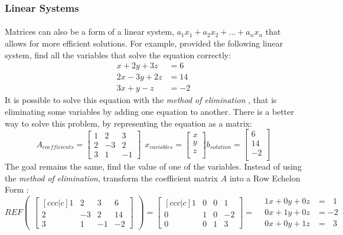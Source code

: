 \documentclass[11pt]{article}
\newcommand\simpleparagraph[1]{%
	\stepcounter{paragraph}\paragraph*{\theparagraph\quad{}#1}}
\renewcommand\theparagraph{}
\begin{document}
\subsubsection{Linear Systems}
\simpleparagraph{}
Matrices can also be a form of a linear system, $a_{1}x_{1}+a_{2}x_{2}+...+a_{n}x_{n}$ that allows for more efficient solutions. For example, provided the following linear system, find all the variables that solve the equation correctly:
{ \small
	\begin{align*}
	x+2y+3z &= 6\\
	2x-3y+2z &= 14\\
	3x+y-z   &= -2
	\end{align*}
}
It is possible to solve this equation with the \textit{method of elimination} \cite{_elimination_2011}, that is eliminating some variables by adding one equation to another. There is a better way to solve this problem, by representing the equation as a matrix:
{ \small
	\begin{equation}
	A_{coefficients} = \begin{bmatrix}
	1 & 2 & 3 \\
	2 & -3& 2 \\
	3 &  1& -1 
	\end{bmatrix}
	\hspace{5pt}
	x_{variables} = \begin{bmatrix}
	x \\
	y \\
	z \\
	\end{bmatrix}
	b_{solution} = \begin{bmatrix}
	6 \\
	14 \\
	-2 \\
	\end{bmatrix}
	\end{equation}
}
The goal remains the same, find the value of one of the variables. Instead of using the \textit{method of elimination}, transform the coefficient matrix $A$ into a Row Echelon Form \cite{weisstein_echelon_2018}:
{ \small
	\begin{equation}
	REF \begin{pmatrix}
	\begin{bmatrix}[ccc|c]
	1 & 2 & 3 & 6\\
	2 &-3 & 2 & 14\\
	3 & 1 &-1 &-2
	\end{bmatrix}
	\end{pmatrix}
	=
	\begin{bmatrix}[ccc|c]
	1 & 0 & 0 & 1 \\
	0 & 1 & 0 & -2 \\
	0 & 0 & 1 & 3 
	\end{bmatrix}
	=
	\hspace{10pt}
	\begin{matrix}
		1x + 0y + 0z &= \hspace{8pt}1\\
		0x + 1y + 0z &= -2\\
		0x + 0y + 1z &= \hspace{8pt}3
	\end{matrix}
	\end{equation}
}
\end{document}
